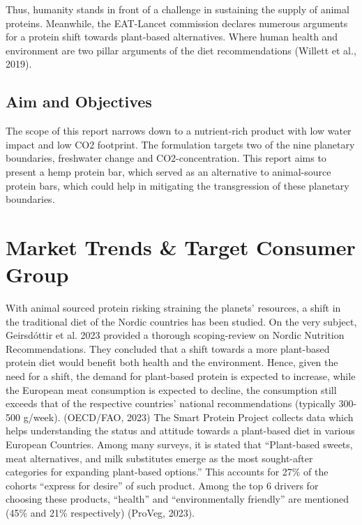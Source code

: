 Thus, humanity stands in front of a challenge in sustaining the supply of animal proteins. Meanwhile, the EAT-Lancet commission declares numerous arguments for a protein shift towards plant-based alternatives. Where human health and environment are two pillar arguments of the diet recommendations (Willett et al., 2019).

\subsection{Aim and Objectives}
The scope of this report narrows down to a nutrient-rich product with low water impact and low CO2  footprint. The formulation targets two of the nine planetary boundaries, freshwater change and CO2-concentration. This report aims to present a hemp protein bar, which served as an alternative to animal-source protein bars, which could help in mitigating the transgression of these planetary boundaries. 

\section{Market Trends \& Target Consumer Group}
With animal sourced protein risking straining the planets' resources, a shift in the traditional diet of the Nordic countries has been studied. On the very subject, Geirsdóttir et al. 2023 provided a thorough scoping-review on Nordic Nutrition Recommendations. They concluded that a shift towards a more plant-based protein diet would benefit both health and the environment. Hence, given the need for a shift, the demand for plant-based protein is expected to increase, while the European meat consumption is expected to decline, the consumption still exceeds that of the respective countries' national recommendations (typically 300-500 g/week). (OECD/FAO, 2023) The Smart Protein Project collects data which helps understanding the status and attitude towards a plant-based diet in various European Countries. Among many surveys, it is stated that “Plant-based sweets, meat alternatives, and milk substitutes emerge as the most sought-after categories for expanding plant-based options.” This accounts for 27\% of the cohorts “express for desire” of such product. Among the top 6 drivers for choosing these products, “health” and “environmentally friendly” are mentioned (45\% and 21\% respectively) (ProVeg, 2023). 

